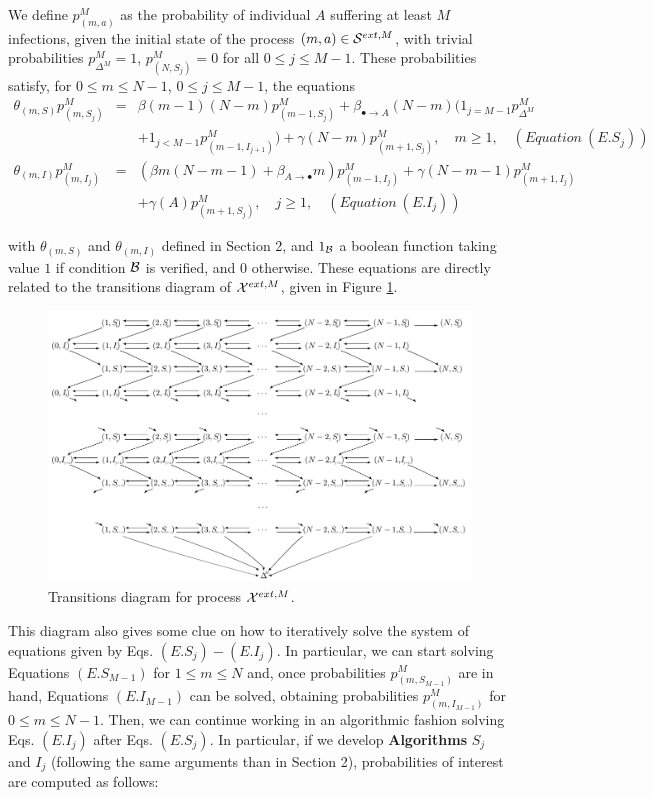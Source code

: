 \documentclass[preprint,12pt]{elsarticle}
\begin{document}
\par We define $p^M_{(m,a)}$ as the probability of individual $A$ suffering at least $M$ infections, given the initial state of the process $(m,a)\in{\cal S}^{ext,M}$,
with trivial probabilities $p^M_{\Delta^M}=1$, $p^M_{(N,S_j)}=0$ for all $0\leq j\leq M-1$. These probabilities satisfy, for $0\leq m\leq N-1$, $0\leq j\leq M-1$, the equations
\vspace{1cm}
\begin{eqnarray*}
 \theta_{(m,S)}p^M_{(m,S_j)} &=& \beta(m-1)(N-m)p^M_{(m-1,S_j)}+\beta_{\bullet\rightarrow A}(N-m)(1_{j=M-1}p^M_{\Delta^M}\\
&&+1_{j<M-1}p^M_{(m-1,I_{j+1})})+\gamma(N-m)p^M_{(m+1,S_j)},\quad m\geq1,\quad (Equation\ (E.S_j))\\
\theta_{(m,I)}p^M_{(m,I_j)} &=& \left(\beta m(N-m-1)+\beta_{A\rightarrow\bullet}m\right)p^M_{(m-1,I_j)}+\gamma(N-m-1)p^M_{(m+1,I_j)}\\
&&+\gamma(A)p^M_{(m+1,S_j)},\quad j\geq 1,\quad (Equation\ (E.I_j))
\end{eqnarray*}
\par\noindent with $\theta_{(m,S)}$ and $\theta_{(m,I)}$ defined in Section 2, and $1_{\cal B}$ a boolean function taking value $1$ if condition ${\cal B}$ is verified, and $0$ otherwise. These equations are directly related to the transitions diagram of ${\cal X}^{ext,M}$, given in Figure \ref{fig:3new}.

\begin{figure}[h!]
\centering
 \includegraphics[width=\textwidth]{Figure3_new.jpg}
\caption{Transitions diagram for process ${\cal X}^{ext,M}$.}
\label{fig:3new}
\end{figure}

\par This diagram also gives some clue on how to iteratively solve the system of equations given by Eqs. $(E.S_j)-(E.I_j)$. In particular, we can start
solving Equations $(E.S_{M-1})$ for $1\leq m\leq N$ and, once probabilities $p^M_{(m,S_{M-1})}$ are in hand, Equations $(E.I_{M-1})$ can be solved, obtaining
probabilities $p^M_{(m,I_{M-1})}$ for $0\leq m\leq N-1$. Then, we can continue working in an algorithmic fashion solving Eqs. $(E.I_j)$ after Eqs.
$(E.S_j)$. In particular, if we develop {\bf Algorithms} $S_j$ and $I_j$ (following the same arguments than in Section 2), probabilities of interest
are computed as follows:
\end{document}
